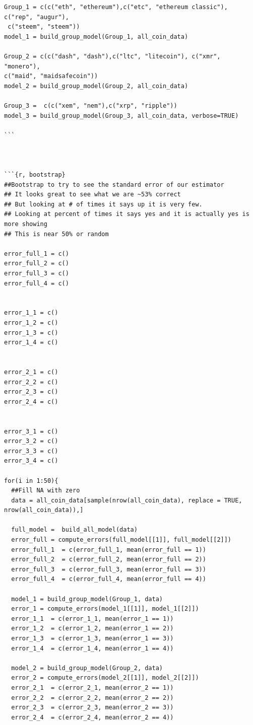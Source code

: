 \documentclass[12pt]{article}
\begin{document}
{\begin{verbatim}
Group_1 = c(c("eth", "ethereum"),c("etc", "ethereum classic"), c("rep", "augur"),
 c("steem", "steem"))
model_1 = build_group_model(Group_1, all_coin_data)

Group_2 = c(c("dash", "dash"),c("ltc", "litecoin"), c("xmr", "monero"), 
c("maid", "maidsafecoin"))
model_2 = build_group_model(Group_2, all_coin_data)

Group_3 =  c(c("xem", "nem"),c("xrp", "ripple"))
model_3 = build_group_model(Group_3, all_coin_data, verbose=TRUE)

```



```{r, bootstrap}
##Bootstrap to try to see the standard error of our estimator
## It looks great to see what we are ~53% correct
## But looking at # of times it says up it is very few.
## Looking at percent of times it says yes and it is actually yes is more showing
## This is near 50% or random

error_full_1 = c()
error_full_2 = c()
error_full_3 = c()
error_full_4 = c()


error_1_1 = c()
error_1_2 = c()
error_1_3 = c()
error_1_4 = c()


error_2_1 = c()
error_2_2 = c()
error_2_3 = c()
error_2_4 = c()


error_3_1 = c()
error_3_2 = c()
error_3_3 = c()
error_3_4 = c()

for(i in 1:50){
  ##Fill NA with zero
  data = all_coin_data[sample(nrow(all_coin_data), replace = TRUE, nrow(all_coin_data)),]

  full_model =  build_all_model(data)
  error_full = compute_errors(full_model[[1]], full_model[[2]])
  error_full_1  = c(error_full_1, mean(error_full == 1))
  error_full_2  = c(error_full_2, mean(error_full == 2))
  error_full_3  = c(error_full_3, mean(error_full == 3))
  error_full_4  = c(error_full_4, mean(error_full == 4))
  
  model_1 = build_group_model(Group_1, data)
  error_1 = compute_errors(model_1[[1]], model_1[[2]])
  error_1_1  = c(error_1_1, mean(error_1 == 1))
  error_1_2  = c(error_1_2, mean(error_1 == 2))
  error_1_3  = c(error_1_3, mean(error_1 == 3))
  error_1_4  = c(error_1_4, mean(error_1 == 4))
  
  model_2 = build_group_model(Group_2, data)
  error_2 = compute_errors(model_2[[1]], model_2[[2]])
  error_2_1  = c(error_2_1, mean(error_2 == 1))
  error_2_2  = c(error_2_2, mean(error_2 == 2))
  error_2_3  = c(error_2_3, mean(error_2 == 3))
  error_2_4  = c(error_2_4, mean(error_2 == 4))
  

\end{verbatim}}
\end{document}
